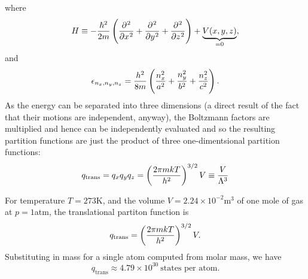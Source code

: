 where 
\begin{equation}
H\equiv-\frac{\hbar^2}{2m}\lf(\diffp[2]{}{x}+\diffp[2]{}{y}+\diffp[2]{}{z} \rt)+\underbrace{V(x,y,z)}_{=0},
\end{equation}
and 
\begin{equation}
\epsilon_{n_x,n_y,n_z}=\frac{h^2}{8m}\left(\frac{n_x^2}{a^2}+\frac{n_y^2}{b^2}+\frac{n_z^2}{c^2} \right).
\end{equation}
As the energy can be separated into three dimensions (a direct result of the fact 
that their motions are independent, anyway), the Boltzmann factors are multiplied 
and hence can be independently evaluated and so the resulting partition functions 
are just the product of three one-dimentsional partition functions:
\begin{equation}
q_{\text{trans}}=q_xq_yq_z=\left(\frac{2\pi mkT}{h^2} \right)^{3/2}V\equiv\frac{V}{\Lambda^3}
\end{equation}
\begin{wex}
For temperature $T=273$K, and the volume $V=2.24\times10^{-2}\text{m}^3$ of one 
mole of gas at $p=1$atm, the translational partiton function is 
\begin{equation}
q_{\text{trans}}=\left(\frac{2\pi mkT}{h^2} \right)^{3/2}V.
\end{equation}
Substituting in mass for a single atom computed from molar mass, we have
\begin{equation}
q_{\text{trans}}\approx4.79\times10^{30}\ \text{states per atom}.
\end{equation}
\end{wex}

